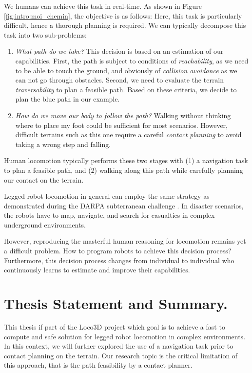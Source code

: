 We humans can achieve this task in real-time. 
As shown in Figure \ref{fig:intro:moi_chemin}, the objective is as follows: 
Here, this task is particularly difficult, hence a thorough planning is required.
We can typically decompose this task into two sub-problems:
\begin{enumerate}
    \item \textit{What path do we take?} 
    This decision is based on an estimation of our capabilities. 
    First, the path is subject to conditions of \textit{reachability}, as we need to be able to touch the ground, and obviously of \textit{collision avoidance} as we can not go through obstacles.
    Second, we need to evaluate the terrain \textit{traversability} to plan a feasible path. 
    Based on these criteria, we decide to plan the blue path in our example.
    \item \textit{How do we move our body to follow the path?} 
    Walking without thinking where to place my foot could be sufficient for most scenarios. However, difficult terrains such as this one require a careful \textit{contact planning} to avoid taking a wrong step and falling.
\end{enumerate}
Human locomotion typically performs these two stages with (1) a navigation task to plan a feasible path, and (2) walking along this path while carefully planning our contact on the terrain.

Legged robot locomotion in general can employ the same strategy as demonstrated during the DARPA subterranean challenge \cite{darpa_nasa_2021, darpa_hutter_2022}.
In disaster scenarios, the robots have to map, navigate, and search for casualties in complex underground environments.

However, reproducing the masterful human reasoning for locomotion remains yet a difficult problem. How to program robots to achieve this decision process?
Furthermore, this decision process changes from individual to individual who continuously learns to estimate and improve their capabilities.



\section{Thesis Statement and Summary.}

This thesis if part of the Loco3D project \cite{loco3d} which goal is to achieve a fast to compute and safe solution for legged robot locomotion in complex environments.
In this context, we will further explored the use of a navigation task prior to contact planning on the terrain.
Our research topic is the critical limitation of this approach, that is the path feasibility by a contact planner.

